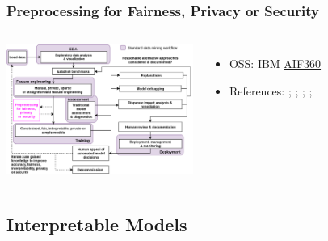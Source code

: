 \documentclass[11pt,
               aspectratio=169,
               hyperref={colorlinks}
               ]{beamer}
\begin{document}
			\begin{frame}
		
				\frametitle{Preprocessing for Fairness, Privacy or Security}		
			
				\begin{columns}
	
					\centering
					\includegraphics[height=120pt]{img/pre.png}
				
					\vspace{-5pt}
					\begin{itemize}
						\item OSS: IBM \href{https://github.com/IBM/AIF360}{AIF360}
						\item References: ; ; ; ; 
					\end{itemize}
				
				\end{columns}			
			
			\end{frame}
			
		\subsection{Interpretable Models}
			
\end{document}
